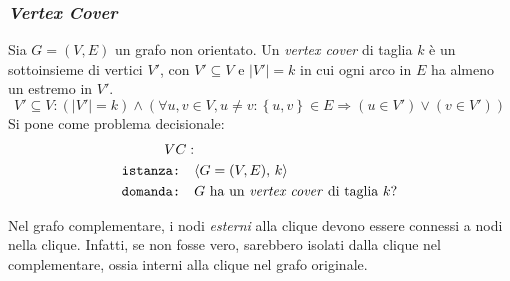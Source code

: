 \subsubsection{\emph{Vertex Cover}}

\begin{definition}
    \label{def:vertcov}
    Sia $G=(V,E)$ un grafo non orientato. Un \emph{vertex cover} di taglia $k$ è un sottoinsieme di vertici $V'$, con $V' \subseteq V$ e $|V'| = k$
    in cui ogni arco in $E$ ha almeno un estremo in $V'$.
    \begin{equation*}
        V' \subseteq V : 
        \left( |V'| = k \right)
        \wedge
        \left( 
            \forall u, v \in V, u \ne v :
            \left\{ u,v \right\} \in E
            \Rightarrow
            \left( u \in V' \right) \vee \left( v \in V' \right)
        \right)
    \end{equation*}
Si pone come problema decisionale:
\begin{align*}
    VC: & \\
    \texttt{istanza:} \quad & \langle G=(V,E), \, k \rangle \\
    \texttt{domanda:} \quad & G \text{ ha un \emph{vertex cover} di taglia } k?
\end{align*}
\end{definition}

Nel grafo complementare, i nodi \emph{esterni} alla clique devono essere connessi a nodi nella clique. Infatti, se non fosse vero, sarebbero isolati dalla clique nel complementare, ossia interni alla clique nel grafo originale.

